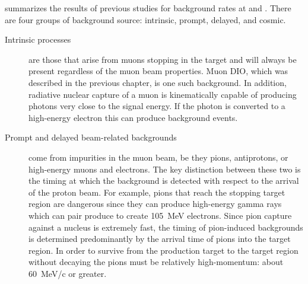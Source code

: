  summarizes the results of previous studies for background rates at \phaseI and \phaseII.
There are four groups of background source: intrinsic, prompt, delayed, and cosmic.
\begin{description}
\item [Intrinsic processes]
                    are those that arise from muons stopping in the target and will always be present regardless of the muon beam properties.
Muon \ac{DIO}, which was described in the previous chapter, is one such background.
In addition, radiative nuclear capture of a muon is kinematically capable of producing photons very close to the signal energy.
If the photon is converted to a high-energy electron this can produce background events.


\item [Prompt and delayed beam-related backgrounds]
                             come from impurities in the muon beam, be they pions, antiprotons, or high-energy muons and electrons.
The key distinction between these two is the timing at which the background is detected with respect to the arrival of the proton beam.
For example, pions that reach the stopping target region are dangerous since they can produce high-energy gamma rays which can pair produce to create 105~MeV electrons.
Since pion capture against a nucleus is extremely fast, the timing of pion-induced backgrounds is determined predominantly by the arrival time of pions into the target region.
In order to survive from the production target to the target region without decaying the pions must be relatively high-momentum: about 60~MeV/c or greater.  


\end{description}
